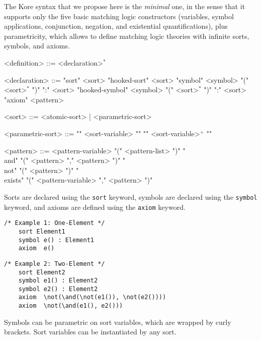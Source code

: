\documentclass[UTF8]{article}
\theoremstyle{plain}
\theoremstyle{definition}
\theoremstyle{remark}
\begin{document}
The Kore syntax that we propose here is the \emph{minimal} one, in the sense that it supports only the five basic matching logic constructors (variables, symbol applications, conjunction, negation, and existential quantifications), plus parametricity, which allows to define matching logic theories with infinite sorts, symbols, and axioms.

\begin{grammar}\small
	<definition>    ::= <declaration>$^*$
	
	<declaration>   ::= "sort" <sort>
	\alt "hooked-sort" <sort>
	\alt "symbol" <symbol> "(" <sort>$^*$ ")" ":" <sort>
	\alt "hooked-symbol" <symbol> "(" <sort>$^*$ ")" ":" <sort>
	\alt "axiom" <pattern>
	
	<sort>          ::= <atomic-sort> | <parametric-sort>
	
	<parametric-sort> ::= "{" <sort-variable> "}"
	\alt <sort-constructor> "{" <sort-variable>$^+$ "}"
	
	<pattern> ::= <pattern-variable>
	\alt <symbol-id> "(" <pattern-list> ")"
	\alt "\\and" "(" <pattern> "," <pattern> ")"
	\alt "\\not" "(" <pattern> ")" 
	\alt "\\exists" "(" <pattern-variable> "," <pattern> ")"
\end{grammar}

\newcommand{\smalltt}[1]{\texttt{\small #1} }
\newcommand{\sort}{\smalltt{sort}}
\newcommand{\symb}{\smalltt{symbol}}
\newcommand{\axiom}{\smalltt{axiom}}


Sorts are declared using the \sort keyword, symbols are declared using the \symb keyword, and axioms are defined using the \axiom keyword.

\begin{Verbatim}[fontsize=\small]
    /* Example 1: One-Element */
    sort Element1
    symbol e() : Element1
    axiom  e()
\end{Verbatim}

\begin{Verbatim}[fontsize=\small]
    /* Example 2: Two-Element */
    sort Element2
    symbol e1() : Element2
    symbol e2() : Element2
    axiom  \not(\and(\not(e1()), \not(e2())))
    axiom  \not(\and(e1(), e2()))
\end{Verbatim}

Symbols can be parametric on sort variables, which are wrapped by curly brackets. 
Sort variables can be instantiated by any sort.
\end{document}
